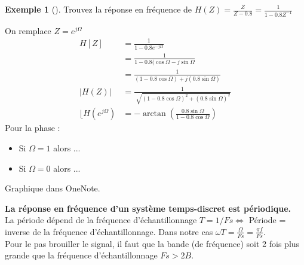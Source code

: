 \documentclass{article}
\theoremstyle{plain}%
\theoremstyle{definition}
\newtheorem{exmp}{Exemple}[section]
\theoremstyle{remark}
\begin{document}
\begin{exmp}[]
    Trouvez la réponse en fréquence de $ H(Z) = \frac{Z}{Z - 0.8} = \frac{1}{1 - 0.8Z^{-1}} $ 

    On remplace $ Z = e^{j \Omega } $  \begin{align*}
        H[Z] &= \frac{1}{1-0.8 e^{-j \Omega }} \\ 
            &= \frac{1}{1 - 0.8(\cos \Omega - j \sin \Omega} \\
            &= \frac{1}{(1 - 0.8 \cos \Omega ) + j (0.8 \sin \Omega )} \\ 
        \left| H(Z) \right| &= \frac{1}{\sqrt[]{(1 - 0.8 \cos \Omega )^2 + (0.8 \sin \Omega )^2}} \\
        \lfloor H(e^{j \Omega }) &= - \arctan ( \frac{0.8 \sin \Omega }{1 - 0.8 \cos \Omega })
    \end{align*}
    Pour la phase : \begin{itemize}
        \item Si $ \Omega = 1 $ alors ...
        \item Si $ \Omega = 0 $ alors ... 
    \end{itemize}
    Graphique dans OneNote. \\
\end{exmp}
\textbf{La réponse en fréquence d'un système temps-discret est périodique.} \\
La période dépend de la fréquence d'échantillonnage $ T = 1 / Fs \Leftrightarrow $ Période = inverse de la fréquence d'échantillonnage. Dans notre cas $ \omega T = \frac{\Omega }{Fs} = \frac{ \pi f}{Fs}$. \\
Pour le pas brouiller le signal, il faut que la bande (de fréquence) soit 2 fois plus grande que la fréquence d'échantillonnage $ Fs > 2B $. 
\end{document}
